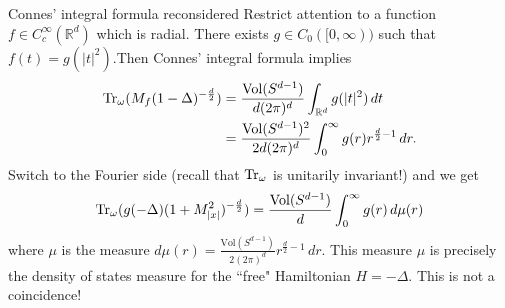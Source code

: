 \documentclass{beamer}
\numberwithin{equation}{section}
\theoremstyle{plain}
\theoremstyle{plain}
\theoremstyle{definition}
\theoremstyle{plain}
\theoremstyle{plain}
\theoremstyle{definition}
\newcommand{\tr}{{\rm Tr}}
\newcommand{\Vol}{\mathrm{Vol}}
\newcommand{\Rl}{\mathbb{R}}
\begin{document}
% 

\begin{frame}{Connes' integral formula reconsidered}
    Restrict attention to a function $f \in C^\infty_c(\Rl^d)$ which is radial. There exists $g \in C_0([0,\infty))$ such that $f(t) = g(|t|^2)$.\pause Then Connes' integral formula implies
    \begin{align*}
        \tr_{\omega}(M_f(1-\Delta)^{-\frac{d}{2}}) &= \frac{\Vol(S^{d-1})}{d(2\pi)^d} \int_{\Rl^d} g(|t|^2)\,dt\\
                                                   &= \frac{\Vol(S^{d-1})^2}{2d(2\pi)^d}\int_{0}^\infty g(r)r^{\frac{d}{2}-1}\,dr.
    \end{align*}\pause
    Switch to the Fourier side (recall that $\tr_{\omega}$ is unitarily invariant!) and we get
    $$
        \tr_{\omega}(g(-\Delta)(1+M_{|x|}^2)^{-\frac{d}{2}}) = \frac{\Vol(S^{d-1})}{d}\int_0^{\infty} g(r) \,d\mu(r)
    $$
    where $\mu$ is the measure $d\mu(r) = \frac{\Vol(S^{d-1})}{2(2\pi)^d}r^{\frac{d}{2}-1}\,dr.$
     \pause
    This measure $\mu$ is precisely the density of states measure for the ``free" Hamiltonian $H = -\Delta$. This is not a coincidence!
\end{frame}
\end{document}
